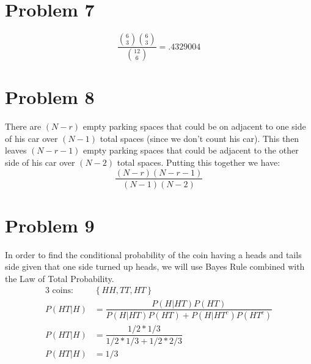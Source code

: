 \documentclass{article}
\begin{document}
\begin{flushleft}
\section*{Problem 7}
\[\dfrac{{6\choose 3}{6\choose 3}}{{12\choose 6}}=.4329004
\]
\section*{Problem 8}
There are $(N-r)$ empty parking spaces that could be on adjacent to one side of his car over $(N-1)$ total spaces (since we don't count his car). This then leaves $(N-r-1)$ empty parking spaces that could be adjacent to the other side of his car over $(N-2)$ total spaces. Putting this together we have:
\[ \dfrac{(N-r)(N-r-1)}{(N-1)(N-2)}
\]
\section*{Problem 9}
In order to find the conditional probability of the coin having a heads and tails side given that one side turned up heads, we will use Bayes Rule combined with the Law of Total Probability.
\begin{align*}
\text{3 coins: } &\left\{HH,TT,HT\right\}\\
P(HT|H)&=\dfrac{P(H|HT)P(HT)}{P(H|HT)P(HT)+P(H|{HT}^c)P({HT}^c)}\\
P(HT|H)&=\dfrac{1/2*1/3}{1/2*1/3+1/2*2/3}\\
P(HT|H)&=1/3
\end{align*}
\end{flushleft}
\end{document}
